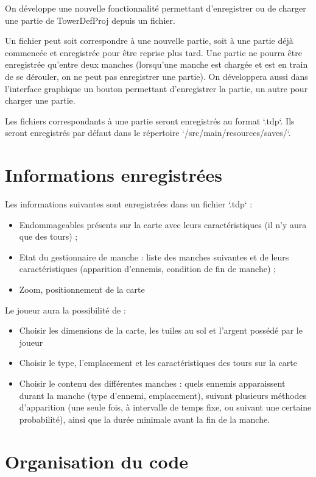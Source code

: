 \documentclass{article}
\begin{document}
On développe une nouvelle fonctionnalité permettant d'enregistrer ou de charger une partie de TowerDefProj depuis un fichier.

Un fichier peut soit correspondre à une nouvelle partie, soit à une partie déjà commencée et enregistrée pour être reprise plus tard.
Une partie ne pourra être enregistrée qu'entre deux manches (lorsqu'une manche est chargée et est en train de se dérouler, on ne peut pas enregistrer une partie).
On développera aussi dans l'interface graphique un bouton permettant d'enregistrer la partie, un autre pour charger une partie.

Les fichiers correspondants à une partie seront enregistrés au format `.tdp`.
Ils seront enregistrés par défaut dans le répertoire `/src/main/resources/saves/`.

\section{Informations enregistrées}

Les informations suivantes sont enregistrées dans un fichier `.tdp` :
\begin{itemize}
\item
  Endommageables présents sur la carte avec leurs caractéristiques (il n'y aura que des tours) ;
\item
  Etat du gestionnaire de manche : liste des manches suivantes et de leurs caractéristiques (apparition d'ennemis, condition de fin de manche) ;
\item
  Zoom, positionnement de la carte
\end{itemize}

\vspace{2em}

Le joueur aura la possibilité de :
\begin{itemize}
\item
  Choisir les dimensions de la carte, les tuiles au sol et l'argent possédé par le joueur
\item
  Choisir le type, l'emplacement et les caractéristiques des tours sur la carte
\item
  Choisir le contenu des différentes manches : quels ennemis apparaissent durant la manche (type d'ennemi, emplacement), suivant plusieurs méthodes d'apparition (une seule fois, à intervalle de temps fixe, ou suivant une certaine probabilité), ainsi que la durée minimale avant la fin de la manche.
\end{itemize}

\section{Organisation du code}
\end{document}
